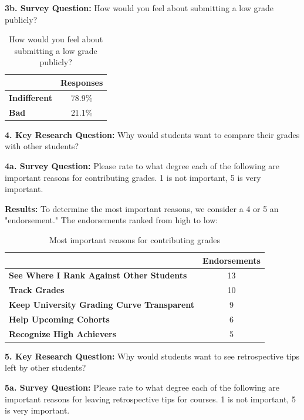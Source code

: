 \textbf{3b. Survey Question:} How would you feel about submitting a low grade publicly?
\smallskip

\begin{table}[H]
\centering
\begin{tabular}{@{}lc@{}}
\toprule
                  & {\textbf{Responses}}  \\ \midrule
\textbf{Indifferent}    & 78.9\%    \\
\textbf{Bad}     & 21.1\%    \\ \bottomrule
\end{tabular}
\caption{How would you feel about submitting a low grade publicly?}
\label{survey3b}
\end{table}

\textbf{4. Key Research Question:} Why would students want to compare their grades with other students?
\smallskip

\textbf{4a. Survey Question:} Please rate to what degree each of the following are important reasons for contributing grades. 1 is not important, 5 is very important.

\textbf{Results:} To determine the most important reasons, we consider a 4 or 5 an "endorsement." The endorsements ranked from high to low:

\begin{table}[H]
\centering
\begin{tabular}{@{}lc@{}}
\toprule
                  & {\textbf{Endorsements}}  \\ \midrule
\textbf{See Where I Rank Against Other Students}    & 13    \\
\textbf{Track Grades}     & 10 \\
\textbf{Keep University Grading Curve Transparent}     & 9 \\
\textbf{Help Upcoming Cohorts}     & 6 \\
\textbf{Recognize High Achievers}     & 5 \\ \bottomrule
\end{tabular}
\caption{Most important reasons for contributing grades}
\label{survey4a}
\end{table}

\textbf{5. Key Research Question:} Why would students want to see retrospective tips left by other students?
\smallskip

\textbf{5a. Survey Question:} Please rate to what degree each of the following are important reasons for leaving retrospective tips for courses. 1 is not important, 5 is very important.

